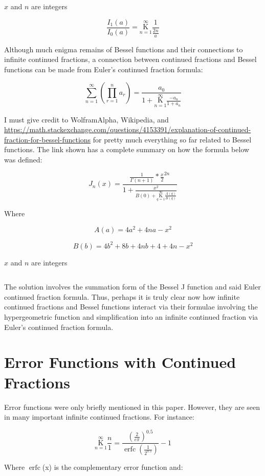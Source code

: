 \documentclass{article}
\DeclareMathOperator\comperrorfunc{erfc}
\begin{document}
$x$ and $n$ are integers

$$\frac{I_1(a)}{I_0(a)} = \underset{n=1}{\overset{\infty}{ \mathrm K}} \frac{1}{\frac{2n}{a}} $$

Although much enigma remains of Bessel functions and their connections to infinite continued fractions, a connection between continued fractions and Bessel functions can be made from Euler’s continued fraction formula:

$$ \underset{n=1}{ \overset{\infty}{\sum}} (\underset{r=1}{ \overset{n}{\prod}} a_r) = \frac{a_0}{1+ \underset{n=1}{\overset{\infty}{ \mathrm K}} \frac{-a_n}{1+a_n}}$$

I must give credit to WolframAlpha, Wikipedia, and \url{https://math.stackexchange.com/questions/4153391/explanation-of-continued-fraction-for-bessel-functions} for pretty much everything so far related to Bessel functions. The link shown has a complete summary on how the formula below was defined:

$$J_n(x)=\frac{\frac{1}{\Gamma(n+1)}*\frac{x}{2}^{2n}}{1+\frac{x^2}{B(0)+ \underset{q=1}{\overset{\infty}{ \mathrm K}} \frac{A(q)}{B(q)}}}$$

Where

$$ A(a) = 4a^2 + 4na - x^2$$

$$ B(b) = 4b^2 + 8b + 4nb + 4 + 4n - x^2$$

$x$ and $n$ are integers

${}$

The solution involves the summation form of the Bessel J function and said Euler continued fraction formula. Thus, perhaps it is truly clear now how infinite continued fractions and Bessel functions interact via their formulae involving the hypergeometric function and simplification into an infinite continued fraction via Euler’s continued fraction formula.

\section {Error Functions with Continued Fractions}

Error functions were only briefly mentioned in this paper. However, they are seen in many important infinite continued fractions. For instance:

$$\underset{n=1}{\overset{\infty}{ \mathrm K}} \frac{n}{1} = \frac{(\frac{2}{e\pi})^{0.5}}{\comperrorfunc(\frac{1}{2^{0.5}})}-1$$

Where $\comperrorfunc$(x) is the complementary error function and:
\end{document}
